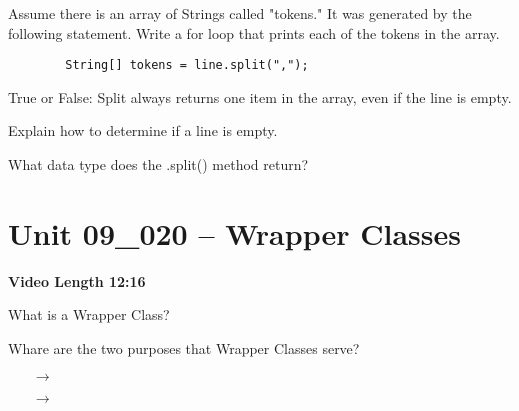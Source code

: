 \documentclass[letterpaper,12pt]{exam}
\newcommand{\unit}{Unit 09}
\begin{document}
\begin{questions}
\begin{samepage}
    \question Assume there is an array of Strings called "tokens."  It was generated by the following statement.  Write a for loop that prints each of the tokens in the array.
    \begin{verbatim}
        String[] tokens = line.split(",");
    \end{verbatim}
        
    \vspace{15mm}
\end{samepage}

\begin{samepage}
    \question True or False:  Split always returns one item in the array, even if the line is empty.
    
\end{samepage}

\begin{samepage}
    \question Explain how to determine if a line is empty.
     \end{samepage}

\begin{samepage}
    \question What data type does the .split() method return?
    \vspace{5mm}
\end{samepage}

\section*{\unit\_020 -- Wrapper Classes } 
\par{\selectfont\textbf{Video Length 12:16}}
\begin{samepage}
    \question What is a Wrapper Class?
    \vspace{10mm}
\end{samepage}

\begin{samepage}
    \question Whare are the two purposes that Wrapper Classes serve?
      \begin{itemize}
        \item[$\rightarrow$]
        \vspace{5mm}
        \item[$\rightarrow$]
        \vspace{5mm}
       \end{itemize}
\end{samepage}


\end{questions}
\end{document}

